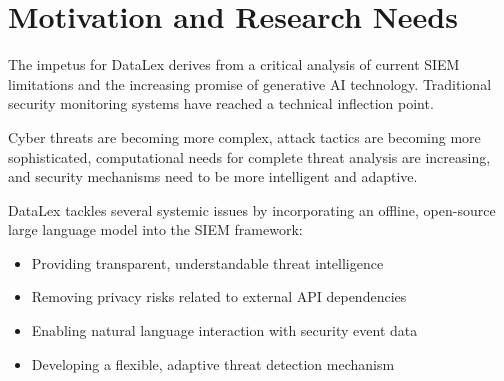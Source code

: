 \section{Motivation and Research Needs}
\label{sec_motivation}

The impetus for DataLex derives from a critical analysis of current SIEM limitations and the increasing promise of generative AI technology. Traditional security monitoring systems have reached a technical inflection point.

Cyber threats are becoming more complex, attack tactics are becoming more sophisticated, computational needs for complete threat analysis are increasing, and security mechanisms need to be more intelligent and adaptive.

DataLex tackles several systemic issues by incorporating an offline, open-source large language model into the SIEM framework:

\begin{itemize}
    \item Providing transparent, understandable threat intelligence
    \item Removing privacy risks related to external API dependencies
    \item Enabling natural language interaction with security event data
    \item Developing a flexible, adaptive threat detection mechanism
\end{itemize}
